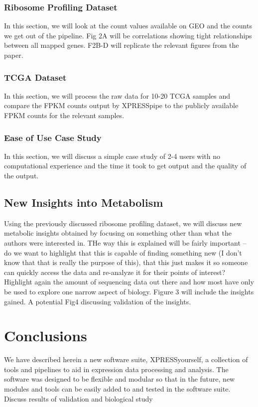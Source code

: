 \documentclass[11pt, a4paper, oneside]{article}
\begin{document}
\subsubsection{Ribosome Profiling Dataset}
In this section, we will look at the count values available on GEO and the counts we get out of the pipeline. Fig 2A will be correlations showing tight relationships between all mapped genes. F2B-D will replicate the relevant figures from the paper.

\subsubsection{TCGA Dataset}
In this section, we will process the raw data for 10-20 TCGA samples and compare the FPKM counts output by XPRESSpipe to the publicly available FPKM counts for the relevant samples.

\subsubsection{Ease of Use Case Study}
In this section, we will discuss a simple case study of 2-4 users with no computational experience and the time it took to get output and the quality of the output.

\subsection{New Insights into Metabolism}
Using the previously discussed ribosome profiling dataset, we will discuss new metabolic insights obtained by focusing on something other than what the authors were interested in. THe way this is explained will be fairly important -- do we want to highlight that this is capable of finding something new (I don't know that that is really the purpose of this), that this just makes it so someone can quickly access the data and re-analyze it for their points of interest? Highlight again the amount of sequencing data out there and how most have only be used to explore one narrow aspect of biology. Figure 3 will include the insights gained. A potential Fig4 discussing validation of the insights.

\section{Conclusions}
We have described herein a new software suite, XPRESSyourself, a collection of tools and pipelines to aid in expression data processing and analysis. The software was designed to be flexible and modular so that in the future, new modules and tools can be easily added to and tested in the software suite.
Discuss results of validation and biological study
\end{document}
